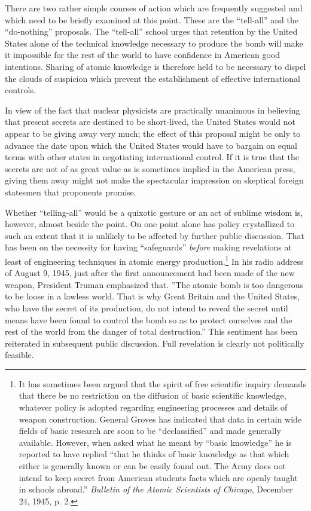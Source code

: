 There are two rather simple courses of action which are frequently suggested and which need to be briefly examined at this point. These are the ``tell-all'' and the ``do-nothing'' proposals. The ``tell-all'' school urges that retention by the United States alone of the technical knowledge necessary to produce the bomb will make it impossible for the rest of the world to have confidence in American good intentions. Sharing of atomic knowledge is therefore held to be necessary to dispel the clouds of suspicion which prevent the establishment of effective international controls.

In view of the fact that nuclear physicists are practically unanimous in believing that present secrets are destined to be short-lived, the United States would not appear to be giving away very much; the effect of this proposal might be only to advance the date upon which the United States would have to bargain on equal terms with other states in negotiating international control. If it is true that the secrets are not of as great value as is sometimes implied in the American press, giving them away might not make the spectacular impression on skeptical foreign statesmen that proponents promise.

Whether ``telling-all'' would be a quixotic gesture or an act of sublime wisdom is, however, almost beside the point. On one point alone has policy crystallized to such an extent that it is unlikely to be affected by further
public discussion. That has been on the necessity for having ``safeguards'' \emph{before} making revelations at least of engineering techniques in atomic energy production.\footnote{It has sometimes been argued that the spirit of free scientific inquiry demands that there be no restriction on the diffusion of basic scientific knowledge, whatever policy is adopted regarding engineering processes and details of weapon construction. General Groves has indicated that data in certain wide fields of basic research are soon to be ``declassified'' and made generally available. However, when asked what he meant by ``basic knowledge'' he is reported to have replied ``that he thinks of basic knowledge as that which either is generally known or can be easily found out. The Army does not intend to keep secret from American students facts which are openly taught in schools abroad.'' \textit{Bulletin of the Atomic Scientists of Chicago}, December 24, 1945, p. 2.} In his radio address of August 9, 1945, just after the first announcement had been made of the new weapon, President Truman emphasized that. ''The atomic bomb is too dangerous to be loose in a lawless world. That is why Great Britain and the United States, who have the secret of its production, do not intend to reveal the secret until means have been found to control the bomb so as to protect ourselves and the rest of the world from the danger of total destruction.'' This sentiment has been reiterated in subsequent public discussion. Full revelation is clearly not politically feasible.

